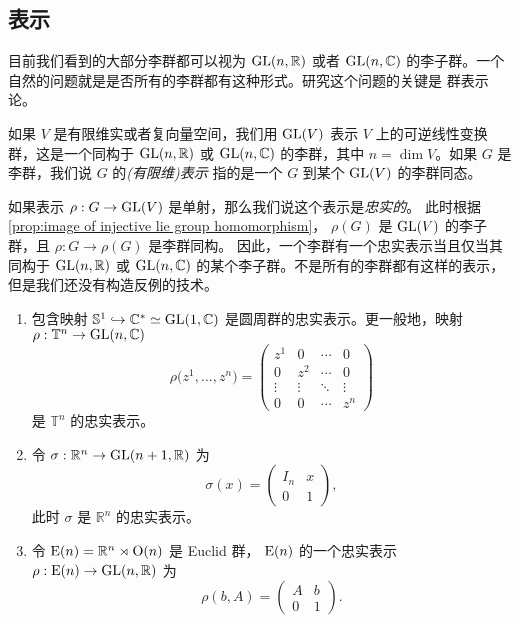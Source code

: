 \subsection{表示}

目前我们看到的大部分李群都可以视为 $\operatorname{GL}(n,\mathbb{R})$ 或者 $\operatorname{GL}(n,\mathbb{C})$
的李子群。一个自然的问题就是是否所有的李群都有这种形式。研究这个问题的关键是
群表示论。

如果 $V$ 是有限维实或者复向量空间，我们用 $\operatorname{GL}(V)$ 表示 $V$ 上的可逆线性变换
群，这是一个同构于 $\operatorname{GL}(n,\mathbb{R})$ 或 $\operatorname{GL}(n,\mathbb{C})$
的李群，其中 $n=\dim V$。如果 $G$ 是李群，我们说 $G$ 的\emph{(有限维)表示}
指的是一个 $G$ 到某个 $\operatorname{GL}(V)$ 的李群同态。

如果表示 $\rho:G\to \operatorname{GL}(V)$ 是单射，那么我们说这个表示是\emph{忠实的}。
此时根据 \autoref{prop:image of injective lie group homomorphism}，
$\rho(G)$ 是 $\operatorname{GL}(V)$ 的李子群，且 $\rho:G\to \rho(G)$ 是李群同构。
因此，一个李群有一个忠实表示当且仅当其同构于 $\operatorname{GL}(n,\mathbb{R})$ 或 $\operatorname{GL}(n,\mathbb{C})$
的某个李子群。不是所有的李群都有这样的表示，但是我们还没有构造反例的技术。

\begin{example}[李群表示]
  \mbox{}
  \begin{enumerate}
    \item 包含映射 $\mathbb{S}^1\hookrightarrow \mathbb{C}^*\simeq \operatorname{GL}(1,\mathbb{C})$
    是圆周群的忠实表示。更一般地，映射 $\rho:\mathbb{T}^n\to \operatorname{GL}(n,\mathbb{C})$
    \[
      \rho\bigl(z^1,\dots,z^n\bigr)  =\begin{pmatrix}
        z^1 & 0 & \cdots & 0 \\
        0 & z^2 & \cdots & 0 \\
        \vdots & \vdots & \ddots & \vdots \\
        0  & 0 & \cdots & z^n 
      \end{pmatrix}
    \]
    是 $\mathbb{T}^n$ 的忠实表示。
    \item 令 $\sigma:\mathbb{R}^n\to \operatorname{GL}(n+1,\mathbb{R})$ 为
    \[
      \sigma(x)=\begin{pmatrix}
        I_n & x \\
        0 & 1
      \end{pmatrix}  ,
    \]
    此时 $\sigma$ 是 $\mathbb{R}^n$ 的忠实表示。
    \item 令 $\operatorname{E}(n)=\mathbb{R}^n\rtimes \operatorname{O}(n)$ 是 Euclid 群，
    $\operatorname{E}(n)$ 的一个忠实表示 $\rho:\operatorname{E}(n)\to \operatorname{GL}(n,\mathbb{R})$ 为
    \[
      \rho(b,A)=\begin{pmatrix}
        A & b \\
        0 & 1
      \end{pmatrix}  .
    \]
  \end{enumerate}
\end{example}

